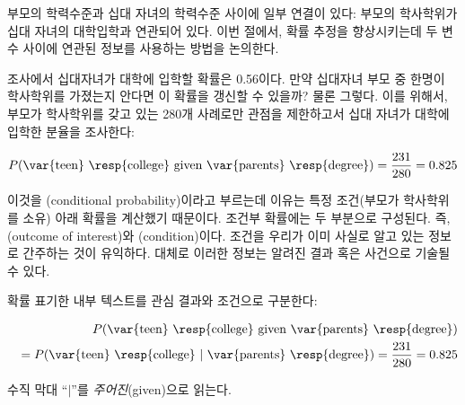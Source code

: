 
부모의 학력수준과 십대 자녀의 학력수준 사이에 일부 연결이 있다: 부모의 학사학위가 십대 자녀의 대학입학과 연관되어 있다. 이번 절에서, 확률 추정을 향상시키는데 두 변수 사이에 연관된 정보를 사용하는 방법을 논의한다. 

조사에서 십대자녀가 대학에 입학할 확률은 0.56이다. 만약 십대자녀 부모 중 한명이 학사학위를 가졌는지 안다면 이 확률을 갱신할 수 있을까? 물론 그렇다.
이를 위해서, 부모가 학사학위를 갖고 있는 280개 사례로만 관점을 제한하고서 십대 자녀가 대학에 입학한 분율을 조사한다:

\begin{eqnarray*}
P(\text{\var{teen} \resp{college} given \var{parents} \resp{degree}}) = \frac{231}{280} = 0.825
\end{eqnarray*}

이것을 (conditional probability)이라고 부르는데 이유는 특정 조건(부모가 학사학위를 소유) 아래 확률을 계산했기 때문이다. 조건부 확률에는 두 부분으로 구성된다. 즉, (outcome of interest)와 (condition)이다. 조건을 우리가 이미 사실로 알고 있는 정보로 간주하는 것이 유익하다. 대체로 이러한 정보는 알려진 결과 혹은 사건으로 기술될 수 있다.

확률 표기한 내부 텍스트를 관심 결과와 조건으로 구분한다:

\begin{eqnarray}
&& P(\text{\var{teen} \resp{college} given \var{parents} \resp{degree}}) \notag \\
&& = P(\text{\var{teen} \resp{college}}\ |\ \text{\var{parents} \resp{degree}}) = \frac{231}{280} = 0.825
\label{probStudentUsedIfParentsUsedInFormalNotation}
\end{eqnarray}

수직 막대 ``$|$''를 \emph{주어진}(given)으로 읽는다.


